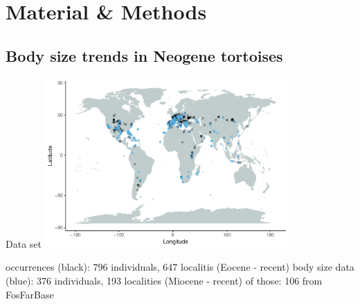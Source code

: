 \section{Material \& Methods}

\subsection{Body size trends in Neogene tortoises}

\begin{frame}{Data set}
\includegraphics[width=0.7\textwidth]{MA_JJ_files/figure-latex/MapFossilOccurrences-1.pdf}

\begin{itemize} %
 occurrences (black): 796 individuals, 647 localitis (Eocene - recent)
\bigskip
{} body size data (blue): 376 individuals, 193 localities (Miocene - recent)
\bigskip
{} of those: 106 from FosFarBase
\end{itemize}

\end{frame}


